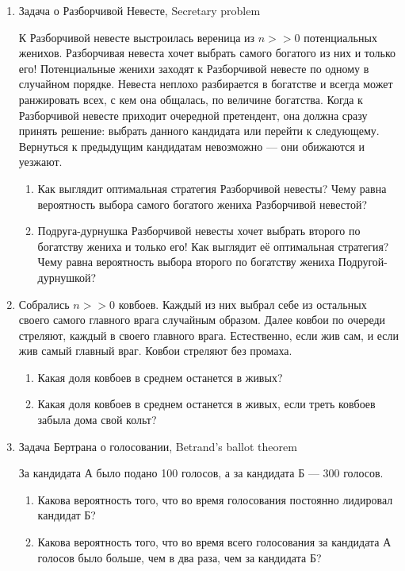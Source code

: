 \documentclass[nobib]{tufte-handout}
\begin{document}
\begin{enumerate}
\item Задача о Разборчивой Невесте, Secretary problem 

К Разборчивой невесте выстроилась вереница из $n>>0$ потенциальных женихов.   Разборчивая невеста хочет выбрать самого богатого из них и только его! Потенциальные женихи заходят к Разборчивой невесте по одному в случайном порядке. Невеста неплохо разбирается в богатстве и всегда может ранжировать всех, с кем она общалась, по величине богатства. Когда к Разборчивой невесте приходит очередной претендент, она должна сразу принять решение: выбрать данного кандидата или перейти к следующему. Вернуться к предыдущим кандидатам невозможно --- они обижаются и уезжают.

\begin{enumerate}
\item Как выглядит оптимальная стратегия Разборчивой невесты? Чему равна вероятность выбора самого богатого жениха Разборчивой невестой?
\item Подруга-дурнушка Разборчивой невесты хочет выбрать второго по богатству жениха и только его!  Как выглядит её оптимальная стратегия? Чему равна вероятность выбора второго по богатству жениха Подругой-дурнушкой?
\end{enumerate}

\item Собрались $n>>0$ ковбоев. Каждый из них выбрал себе из остальных своего самого главного врага случайным образом. Далее ковбои по очереди стреляют, каждый в своего главного врага. Естественно, если жив сам, и если жив самый главный враг. Ковбои стреляют без промаха. 
\begin{enumerate}
\item Какая доля ковбоев в среднем останется в живых?
\item Какая доля ковбоев в среднем останется в живых, если треть ковбоев забыла дома свой кольт?
\end{enumerate}

\item Задача Бертрана о голосовании, Betrand's ballot theorem

За кандидата А было подано 100 голосов, а за кандидата Б --- 300 голосов. 
\begin{enumerate}
\item Какова вероятность того, что во время голосования постоянно лидировал кандидат Б?
\item Какова вероятность того, что во время всего голосования за кандидата А  голосов было больше, чем в два раза, чем за кандидата Б?
\end{enumerate}


\end{enumerate}
\end{document}

